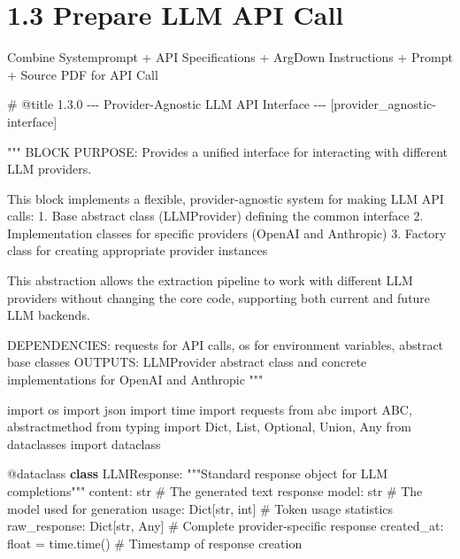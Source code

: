 \documentclass[
  11pt,
  letterpaper,
]{book}
\newenvironment{Shaded}{\begin{snugshade}}{\end{snugshade}}
\newcommand{\AttributeTok}[1]{\textcolor[rgb]{0.40,0.45,0.13}{#1}}
\newcommand{\BuiltInTok}[1]{\textcolor[rgb]{0.00,0.23,0.31}{#1}}
\newcommand{\CommentTok}[1]{\textcolor[rgb]{0.37,0.37,0.37}{#1}}
\newcommand{\ImportTok}[1]{\textcolor[rgb]{0.00,0.46,0.62}{#1}}
\newcommand{\KeywordTok}[1]{\textcolor[rgb]{0.00,0.23,0.31}{\textbf{#1}}}
\newcommand{\NormalTok}[1]{\textcolor[rgb]{0.00,0.23,0.31}{#1}}
\newcommand{\OperatorTok}[1]{\textcolor[rgb]{0.37,0.37,0.37}{#1}}
\begin{document}
\section{1.3 Prepare LLM API Call}\label{prepare-llm-api-call}

Combine Systemprompt + API Specifications + ArgDown Instructions +
Prompt + Source PDF for API Call

\label{provider_agnostic-interface}
\begin{Shaded}
\begin{Highlighting}[]
\CommentTok{\# @title 1.3.0 {-}{-}{-} Provider{-}Agnostic LLM API Interface {-}{-}{-} [provider\_agnostic{-}interface]}

\CommentTok{"""}
\CommentTok{BLOCK PURPOSE: Provides a unified interface for interacting with different LLM providers.}

\CommentTok{This block implements a flexible, provider{-}agnostic system for making LLM API calls:}
\CommentTok{1. Base abstract class (LLMProvider) defining the common interface}
\CommentTok{2. Implementation classes for specific providers (OpenAI and Anthropic)}
\CommentTok{3. Factory class for creating appropriate provider instances}

\CommentTok{This abstraction allows the extraction pipeline to work with different LLM providers}
\CommentTok{without changing the core code, supporting both current and future LLM backends.}

\CommentTok{DEPENDENCIES: requests for API calls, os for environment variables, abstract base classes}
\CommentTok{OUTPUTS: LLMProvider abstract class and concrete implementations for OpenAI and Anthropic}
\CommentTok{"""}

\ImportTok{import}\NormalTok{ os}
\ImportTok{import}\NormalTok{ json}
\ImportTok{import}\NormalTok{ time}
\ImportTok{import}\NormalTok{ requests}
\ImportTok{from}\NormalTok{ abc }\ImportTok{import}\NormalTok{ ABC, abstractmethod}
\ImportTok{from}\NormalTok{ typing }\ImportTok{import}\NormalTok{ Dict, List, Optional, Union, Any}
\ImportTok{from}\NormalTok{ dataclasses }\ImportTok{import}\NormalTok{ dataclass}

\AttributeTok{@dataclass}
\KeywordTok{class}\NormalTok{ LLMResponse:}
    \CommentTok{"""Standard response object for LLM completions"""}
\NormalTok{    content: }\BuiltInTok{str}            \CommentTok{\# The generated text response}
\NormalTok{    model: }\BuiltInTok{str}              \CommentTok{\# The model used for generation}
\NormalTok{    usage: Dict[}\BuiltInTok{str}\NormalTok{, }\BuiltInTok{int}\NormalTok{]   }\CommentTok{\# Token usage statistics}
\NormalTok{    raw\_response: Dict[}\BuiltInTok{str}\NormalTok{, Any]  }\CommentTok{\# Complete provider{-}specific response}
\NormalTok{    created\_at: }\BuiltInTok{float} \OperatorTok{=}\NormalTok{ time.time()  }\CommentTok{\# Timestamp of response creation}


\end{Highlighting}
\end{Shaded}
\end{document}
